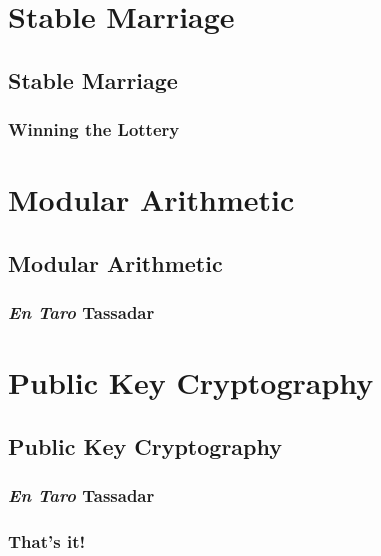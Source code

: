 \documentclass[9pt]{beamer}
\begin{document}
\section{Stable Marriage}
\subsection{Stable Marriage}

\begin{frame}[fragile]
  \frametitle{Winning the Lottery}
\end{frame}


\section{Modular Arithmetic}
  \subsection{Modular Arithmetic}

\begin{frame}[fragile]
  \frametitle{\emph{En Taro} Tassadar}
\end{frame}


\section{Public Key Cryptography}
  \subsection{Public Key Cryptography}

\begin{frame}[fragile]
  \frametitle{\emph{En Taro} Tassadar}
\end{frame}


\begin{frame}
  \frametitle{\huge{That's it!}}
\end{frame}
\end{document}
